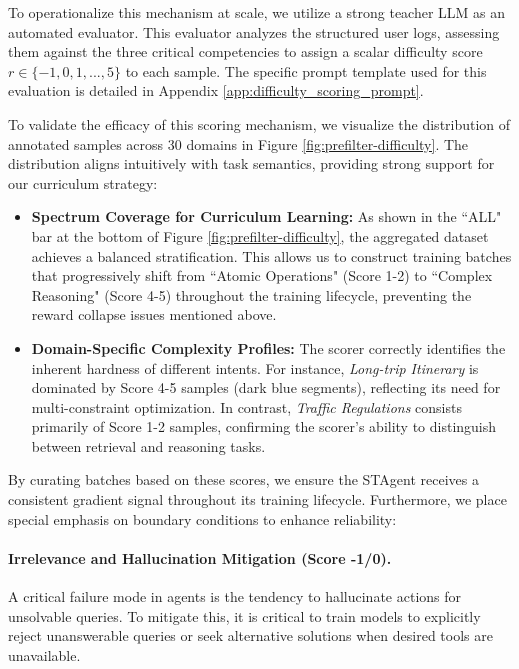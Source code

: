 \documentclass{article} %
\newcommand{\model}{STAgent\xspace}
\begin{document}
To operationalize this mechanism at scale, we utilize a strong teacher LLM as an automated evaluator. This evaluator analyzes the structured user logs, assessing them against the three critical competencies to assign a scalar difficulty score $r \in \{-1, 0, 1, ..., 5\}$ to each sample. The specific prompt template used for this evaluation is detailed in Appendix \ref{app:difficulty_scoring_prompt}.

To validate the efficacy of this scoring mechanism, we visualize the distribution of annotated samples across 30 domains in Figure \ref{fig:prefilter-difficulty}. The distribution aligns intuitively with task semantics, providing strong support for our curriculum strategy:
\begin{itemize}\item \textbf{Spectrum Coverage for Curriculum Learning:} As shown in the ``ALL" bar at the bottom of Figure \ref{fig:prefilter-difficulty}, the aggregated dataset achieves a balanced stratification. This allows us to construct training batches that progressively shift from ``Atomic Operations" (Score 1-2) to ``Complex Reasoning" (Score 4-5) throughout the training lifecycle, preventing the reward collapse issues mentioned above.\item \textbf{Domain-Specific Complexity Profiles:} The scorer correctly identifies the inherent hardness of different intents. For instance, \textit{Long-trip Itinerary} is dominated by Score 4-5 samples (dark blue segments), reflecting its need for multi-constraint optimization. In contrast, \textit{Traffic Regulations} consists primarily of Score 1-2 samples, confirming the scorer's ability to distinguish between retrieval and reasoning tasks.
\end{itemize}

By curating batches based on these scores, we ensure the \model receives a consistent gradient signal throughout its training lifecycle. Furthermore, we place special emphasis on boundary conditions to enhance reliability:




\paragraph{Irrelevance and Hallucination Mitigation (Score -1/0).} A critical failure mode in agents is the tendency to hallucinate actions for unsolvable queries. To mitigate this, it is critical to train models to explicitly reject unanswerable queries or seek alternative solutions when desired tools are unavailable.
\end{document}
